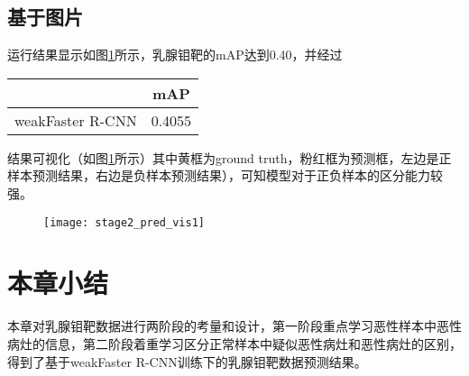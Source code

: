 \subsection{基于图片}
运行结果显示如图\ref{tab:2_stage_2_pred_result_based_on_image}所示，乳腺钼靶的mAP达到0.40，并经过
\begin{table}[!htbp]
    \label{tab:2_stage_2_pred_result_based_on_image}
    \centering
    \footnotesize%
    \setlength{\tabcolsep}{4pt}%
    \renewcommand{\arraystretch}{1.2}%
    \begin{tabular}{cc}
        \hline
        &mAP\\
        \hline
        weakFaster R-CNN& 0.4055\\
        \hline
    \end{tabular}
\end{table}
结果可视化（如图\ref{fig:stage2_pred_vis1}所示）其中黄框为ground truth，粉红框为预测框，左边是正样本预测结果，右边是负样本预测结果），可知模型对于正负样本的区分能力较强。
\begin{figure}[!htbp]
    \centering
    \texttt{[image: stage2\_pred\_vis1]}
    \label{fig:stage2_pred_vis1}
\end{figure}

\section{本章小结}
本章对乳腺钼靶数据进行两阶段的考量和设计，第一阶段重点学习恶性样本中恶性病灶的信息，第二阶段着重学习区分正常样本中疑似恶性病灶和恶性病灶的区别，得到了基于weakFaster R-CNN训练下的乳腺钼靶数据预测结果。